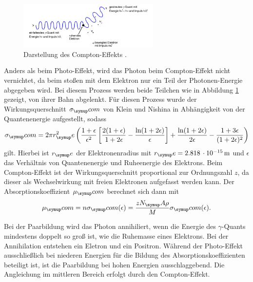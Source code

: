\begin{figure}
  \includegraphics[width=7cm]{bilder/compton.jpg}
  \caption{Darstellung des Compton-Effekts \cite{704}.}
  \label{fig:com}
\end{figure}
Anders als beim Photo-Effekt, wird das Photon beim Compton-Effekt nicht vernichtet,
da beim stoßen mit dem Elektron nur ein Teil der Photonen-Energie abgegeben wird.
Bei diesem Prozess werden beide Teilchen wie in Abbildung \ref{fig:com} gezeigt,
von ihrer Bahn abgelenkt.
Für diesen Prozess wurde der Wirkungsquerschnitt $\sigma_\su{com}$ von Klein und
Nishina in Abhängigkeit von der Quantenenergie aufgestellt, sodass
\begin{equation}
  \sigma_\su{com}= 2\pi r^2_\su{e}\lf(\frac{1+\epsilon}{\epsilon^2}\lf[\frac{2(1+
  \epsilon)}{1+2\epsilon}-\frac{\ln(1+2\epsilon)}{\epsilon}\rt]+\frac{\ln(1+2\epsilon)}
  {2\epsilon}-\frac{1+3\epsilon}{(1+2\epsilon)^2}\rt)
  \label{eqn:sigma}
\end{equation}
gilt. Hierbei ist $r_\su{e}$ der Elektronenradius mit $r_\su{e}=2.818\,\cdot10^
{-15}\mt$ \cite{rad} und $\epsilon$ das Verhältnis von Quantenenergie und Ruheenergie
des Elektrons.
Beim Compton-Effekt ist der Wirkungsquerschnitt proportional zur Ordnungszahl $z$,
da dieser als Wechselwirkung mit freien Elektronen aufgefasst werden kann.
Der Absorptionskoeffizient $\mu_\su{com}$ berechnet sich dann mit
\begin{equation}
  \mu_\su{com}=n\sigma_\su{com}(\epsilon)=\frac{zN_\su{A}\rho}{M}\sigma_\su{com}
  (\epsilon).
  \label{eqn:mu}
\end{equation}

Bei der Paarbildung wird das Photon annihiliert, wenn die Energie des $\gamma$-Quants
mindestens doppelt so groß ist, wie die Ruhemasse eines Elektrons. Bei der
Annihilation entstehen ein Eletron und ein Positron.
Während der Photo-Effekt ausschließlich bei niederen Energien für die Bildung des
Absorptionskoeffizienten beteiligt ist, ist die Paarbildung bei hohen Energien
ausschlaggebend. Die Angleichung im mittleren Bereich erfolgt durch den
Compton-Effekt.

